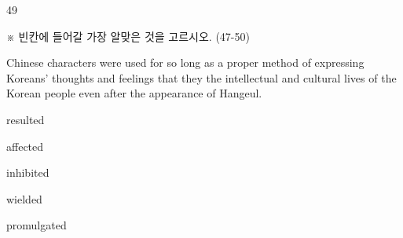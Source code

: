 \begin{question}{49}
\begin{framedtext}
※ 빈칸에 들어갈 가장 알맞은 것을 고르시오. (47-50) \par
\end{framedtext}
Chinese characters were used for so long as a proper method of expressing Koreans' thoughts and feelings that they \blank{} the intellectual and cultural lives of the Korean people even after the appearance of Hangeul.
\begin{choices}
  \item resulted
  \item affected
  \item inhibited
  \item wielded
  \item promulgated
\end{choices}
\end{question}
